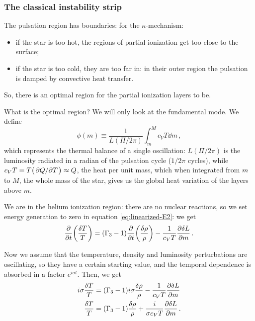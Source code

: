 \documentclass[main.tex]{subfiles}
\begin{document}
\subsubsection{The classical instability strip}

The pulsation region has boundaries:
for the \(\kappa \)-mechanism:
\begin{itemize}
    \item if the star is too hot, the regions of partial ionization get too close to the surface;
    \item if the star is too cold, they are too far in: in their outer region the pulsation is damped by convective heat transfer.
\end{itemize}

So, there is an optimal region for the partial ionization layers to be.

What is the optimal region? We will only look  at the fundamental mode. We define
%
\begin{equation}
  \phi (m) \equiv \frac{1}{L(\Pi / 2 \pi )}\int_m^M c_V T \dd{m} 
\,,
\end{equation}
%
which represents the thermal balance of a single oscillation: \(L(\Pi / 2 \pi )\) is the luminosity radiated in a radian of the pulsation cycle (\(1/ 2 \pi \) cycles), 
while \(c_V T = T \qty(\pdv*{Q}{T}) \approx Q\), the heat per unit mass, which when integrated from \(m\) to \(M\), the whole mass of the star, gives us the global heat variation of the layers above \(m\). 

We are in the helium ionization region: there are no nuclear reactions, so we set energy generation to zero in equation \eqref{eq:linearized-E2}: we get 
%
\begin{align}
\pdv{}{t} \qty(\frac{ \delta T}{T}) =
(\Gamma_3 -1) \pdv{}{t} \qty(\frac{ \delta \rho }{\rho })
- \frac{1}{c_V T} \pdv{ \delta L}{m}
\,.
\end{align}

Now we assume that the temperature, density and luminosity perturbations are oscillating, so they have a certain starting value, and the temporal dependence is absorbed in a factor \(e^{i \sigma t}\). Then, we get 
%
\begin{subequations}
\begin{align}
i \sigma \frac{ \delta T}{T} &= (\Gamma_3 -1) i \sigma \frac{ \delta \rho }{\rho } - \frac{1}{c_V T} \pdv{ \delta L}{m} \\
\frac{ \delta T}{T} &= (\Gamma_3 -1) \frac{ \delta \rho }{\rho } + \frac{i}{\sigma  c_V T} \pdv{ \delta L}{m} 
\,.
\end{align}
\end{subequations}
\end{document}
